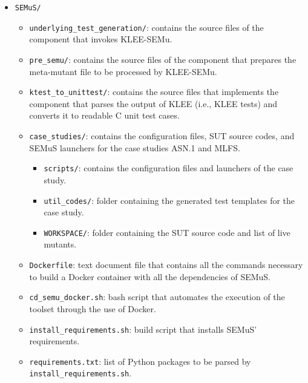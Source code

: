 \begin{itemize}
  \item \texttt{SEMuS/}
  \begin{itemize}
    \item \texttt{underlying\_test\_generation/}: contains the source files of the component that invokes KLEE-SEMu.
    \item \texttt{pre\_semu/}: contains the source files of the component that prepares the meta-mutant file to be processed by KLEE-SEMu.
    \item \texttt{ktest\_to\_unittest/}: contains the source files that implements the component that parses the output of KLEE (i.e., KLEE tests) and converts it to readable C unit test cases.
    \item \texttt{case\_studies/}: contains the configuration files, SUT source codes, and SEMuS launchers for the case studies ASN.1 and MLFS.
    \begin{itemize}
      \item \texttt{scripts/}: contains the configuration files and launchers of the case study.
      \item \texttt{util\_codes/}: folder containing the generated test templates for the case study.
      \item \texttt{WORKSPACE/}: folder containing the SUT source code and list of live mutants.
    \end{itemize}
    \item \texttt{Dockerfile}: text document file that contains all the commands necessary to build a Docker container with all the dependencies of SEMuS.
    \item \texttt{cd\_semu\_docker.sh}: bash script that automates the execution of the toolset through the use of Docker.
    \item \texttt{install\_requirements.sh}: build script that installs SEMuS' requirements.
    \item \texttt{requirements.txt}: list of Python packages to be parsed by \texttt{install\_requirements.sh}.
  \end{itemize}
\end{itemize}
